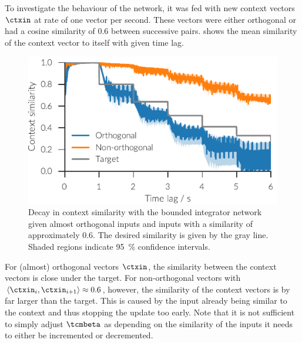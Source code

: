 To investigate the behaviour of the network, it was fed with new context vectors $\ctxin$ at rate of one vector per second.
These vectors were either orthogonal or had a cosine similarity of \num{0.6} between successive pairs.
 shows the mean similarity of the context vector to itself with given time lag.
\begin{figure}
    \centering
    \includegraphics{figures/context-analysis/bounded-integrator}
    \caption[Decay in context similarity with the bounded integrator network.]{
        Decay in context similarity with the bounded integrator network given almost orthogonal inputs and inputs with a similarity of approximately \num{0.6}.
        The desired similarity is given by the gray line. Shaded regions indicate \SI{95}{\percent} confidence intervals.}\label{fig:bounded-integrator}
\end{figure}
For (almost) orthogonal vectors $\ctxin$, the similarity between the context vectors is close under the target.
For non-orthogonal vectors with $\langle\ctxin_i, \ctxin_{i+1}\rangle \approx 0.6$, however, the similarity of the context vectors is by far larger than the target.
This is caused by the input already being similar to the context and thus stopping the update too early.
Note that it is not sufficient to simply adjust $\tcmbeta$ as depending on the similarity of the inputs it needs to either be incremented or decremented.

